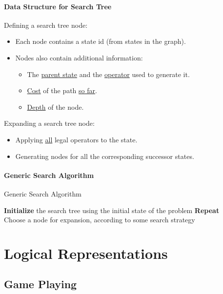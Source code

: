 \documentclass[10pt, a4paper, oneside]{book}
\theoremstyle{theoremdd}
\theoremstyle{remark}
\begin{document}
\subsection{Data Structure for Search Tree}
Defining a search tree node: 
\begin{itemize}
\item Each node contains a state id (from states in the graph).
\item Nodes also contain additional information: 
\begin{itemize}
\item The \underline{parent state} and the \underline{operator} used to generate it.
\item \underline{Cost} of the path \underline{so far}.
\item \underline{Depth} of the node.
\end{itemize}
\end{itemize}
Expanding a search tree node: 
\begin{itemize}
\item Applying \underline{all} legal operators to the state.
\item Generating nodes for all the corresponding successor states.
\end{itemize}

\subsection{Generic Search Algorithm}
\begin{algorithm}[H]
\SetAlgoLined
\caption{Generic Search Algorithm}
\textbf{Initialize} the search tree using the initial state of the problem\;
\textbf{Repeat} \\
Choose a node for expansion, according to some search strategy\;
\end{algorithm}



\part{Logical Representations}
\chapter{Game Playing}
\end{document}
